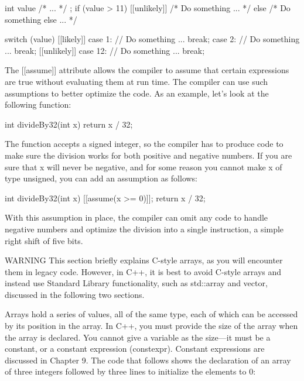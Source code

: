 \begin{cpp}
int value { /* ... */ };
if (value > 11) [[unlikely]] { /* Do something ... */ }
else { /* Do something else ... */ }

switch (value)
{
    [[likely]] case 1:
        // Do something ...
        break;
    case 2:
        // Do something ...
        break;
    [[unlikely]] case 12:
        // Do something ...
        break;
}
\end{cpp}


\mySamllsection{[[assume]]}

The [[assume]] attribute allows the compiler to assume that certain expressions are true without evaluating them at run time. The compiler can use such assumptions to better optimize the code. As an example, let’s look at the following function:

\begin{cpp}
int divideBy32(int x)
{
    return x / 32;
}
\end{cpp}

The function accepts a signed integer, so the compiler has to produce code to make sure the division works for both positive and negative numbers. If you are sure that x will never be negative, and for some reason you cannot make x of type unsigned, you can add an assumption as follows:

\begin{cpp}
int divideBy32(int x)
{
    [[assume(x >= 0)]];
    return x / 32;
}
\end{cpp}

With this assumption in place, the compiler can omit any code to handle negative numbers and optimize the division into a single instruction, a simple right shift of five bits.


\begin{myWarning}{WARNING}
This section briefly explains C-style arrays, as you will encounter them in legacy code. However, in C++, it is best to avoid C-style arrays and instead use Standard Library functionality, such as std::array and vector, discussed in the following two sections.
\end{myWarning}

Arrays hold a series of values, all of the same type, each of which can be accessed by its position in the array. In C++, you must provide the size of the array when the array is declared. You cannot give a variable as the size—it must be a constant, or a constant expression (constexpr). Constant expressions are discussed in Chapter 9. The code that follows shows the declaration of an array of three integers followed by three lines to initialize the elements to 0:

